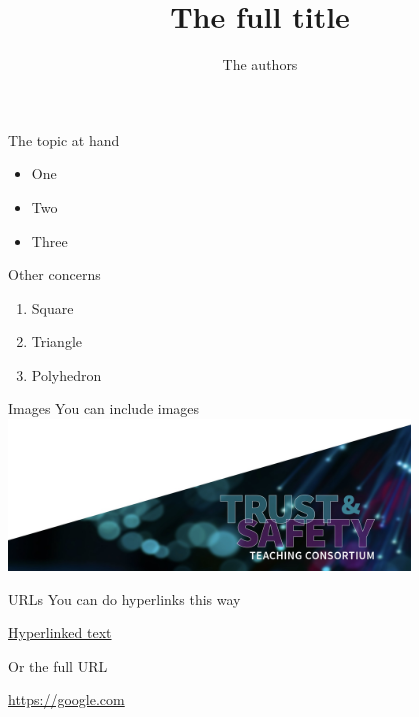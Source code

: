 \documentclass[nobackground,dvipsnames,table]{beamer}
\date[]{}
\title{The full title}
\author[]{The authors}
\begin{document}
\begin{frame}
	\titlepage
\end{frame}

\begin{frame}{The topic at hand}
    \begin{itemize}
        \item One
        \item Two
        \item Three
    \end{itemize}
\end{frame}

\begin{frame}{Other concerns}
    \begin{enumerate}
        \item Square
        \item Triangle
        \item Polyhedron
    \end{enumerate}
\end{frame}

\begin{frame}{Images}
    You can include images
    \includegraphics[width=0.8\textwidth]{img/consortium-image}
\end{frame}

\begin{frame}{URLs}
    You can do hyperlinks this way

    \href{https:://google.com}{Hyperlinked text}

    Or the full URL

    \url{https://google.com}

\end{frame}
\end{document}
